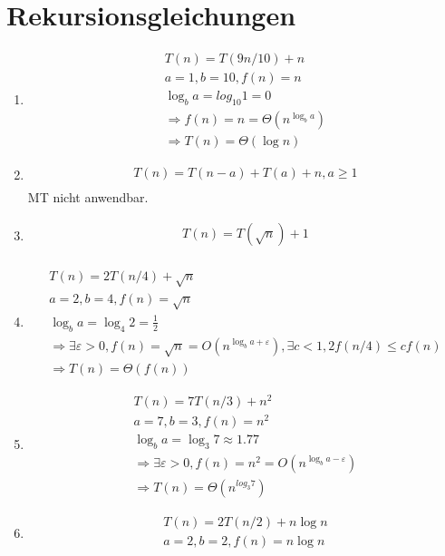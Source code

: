 \documentclass[a4paper,10pt]{scrartcl}
\begin{document}
\section{Rekursionsgleichungen}
\begin{enumerate}
\item	\begin{align}
	T(n) = T(9n/10)+n \\
	a = 1, b = 10, f(n) = n \\
	\log _b a = log _{10} 1 = 0 \\
	\Rightarrow f(n) = n = \Theta(n^{\log _b a}) \\
	\Rightarrow T(n) = \Theta(\log n) \tag{Fall 2 des Master-Theorems}
	\end{align}
\item	\begin{align}
	T(n) = T(n-a) + T(a) + n, a \geq 1 \\
	\end{align}
	MT nicht anwendbar.
\item	\begin{align}
	T(n) = T(\sqrt{n}) + 1 \\
	\end{align}
\item	\begin{align}
	T(n) = 2T(n/4) + \sqrt{n} \\
	a = 2, b = 4, f(n) = \sqrt{n} \\
	\log _b a = \log _4 2 = \frac{1}{2} \\
	\Rightarrow \exists \varepsilon > 0, f(n) = \sqrt{n} = O(n^{\log
	_b a+\varepsilon}), \exists c < 1, 2f(n/4) \leq cf(n) \\
	\Rightarrow T(n) = \Theta(f(n)) \tag{Fall 3 des Master-Theorems}
	\end{align}
\item	\begin{align}
	T(n) = 7T(n/3) + n^2 \\
	a = 7, b = 3, f(n) = n^2 \\
	\log _b a = \log _3 7 \approx 1.77 \\
	\Rightarrow \exists \varepsilon > 0, f(n) = n^2 = O(n^{\log _b a-\varepsilon}) \\
	\Rightarrow T(n) = \Theta(n^{log _3 7}) \tag{Fall 1 des Master-Theorems}
	\end{align}
\item	\begin{align}
	T(n) = 2T(n/2) + n \log n \\
	a = 2, b = 2, f(n) = n \log n \\

\end{align}
\end{enumerate}
\end{document}
